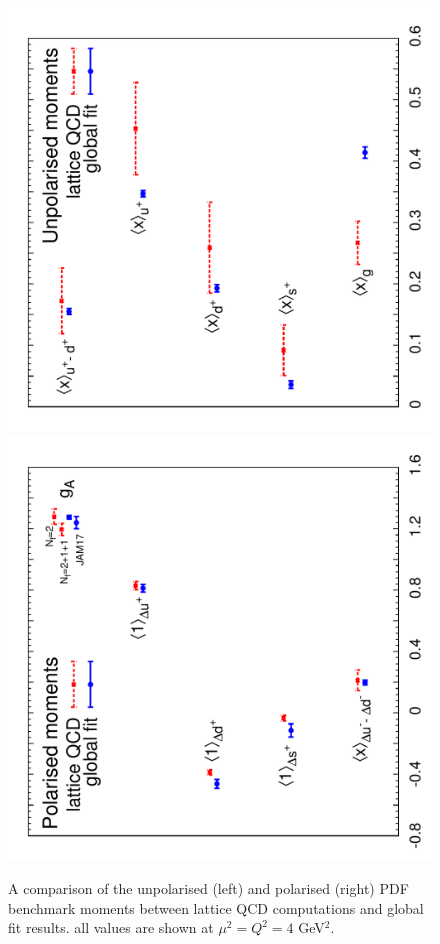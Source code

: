 \begin{figure}[!t]
\centering
\includegraphics[scale=0.44,angle=270]{plots/unpmoms}
\includegraphics[scale=0.44,angle=270]{plots/polmoms}\\
\caption{\small A comparison of the unpolarised (left) and polarised (right) 
PDF benchmark moments between lattice QCD computations and global fit results.
%
all values are shown at $\mu^2=Q^2=4$ GeV$^2$.}
\label{fig:Bmoms}
\end{figure}

